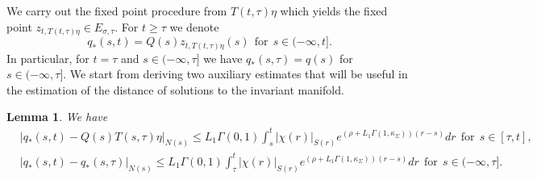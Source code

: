 \documentclass[a4paper,11pt,reqno]{amsart}
\theoremstyle{plain}
\newtheorem{lem}{Lemma}[section]
\theoremstyle{definition}
\numberwithin{equation}{section}
\renewcommand{\geq}{\geqslant}
\renewcommand{\leq}{\leqslant}
\begin{document}
We carry out the fixed point procedure  from $T(t,\tau)\eta$ which yields the fixed point $z_{t,T(t,\tau)\eta} \in E_{\sigma,\tau}$. 
For $t\geq\tau$ we denote
$$q_{*}(s,t)=Q(s)z_{t,T(t,\tau)\eta}(s)\ \ \text{for}\ \ s\in (-\infty,t].$$
In particular, for $t=\tau$ and $s\in (-\infty,\tau]$ we have $q_{*}(s,\tau)=q(s)$ for $s\in (-\infty,\tau]$. We start from deriving two auxiliary estimates that will be useful in the estimation of the distance of solutions to the invariant manifold. 



\begin{lem}
We have
\begin{align}\label{e:QSTAR1}
& |q_{*}(s,t)-Q(s)T(s,\tau)\eta|_{N(s)}\leq L_1\Gamma(0,1)\int_{s}^{t}|\chi(r)|_{S(r)}e^{(\rho+L_1\Gamma(1,\kappa_\Sigma))(r-s)}dr\ \ \text{for}\ \  s\in[\tau,t],\\
& \label{e:QSTAR2}
|q_{*}(s,t)-q_{*}(s,\tau)|_{N(s)}\leq L_1\Gamma(0,1)\int_{\tau}^{t} |\chi(r)|_{S(r)}e^{(\rho+L_1\Gamma(1,\kappa_\Sigma))(r-s)}dr\ \ \text{for}\ \  s\in (-\infty,\tau].
\end{align}
\end{lem}
\end{document}
